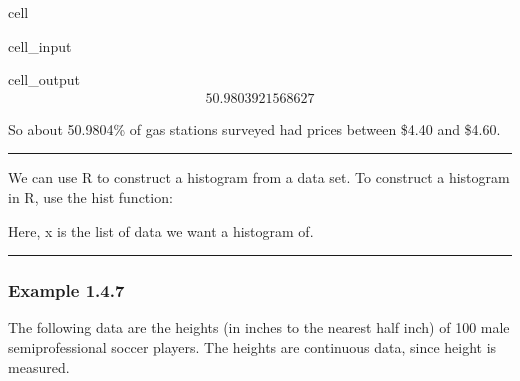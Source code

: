 \documentclass[letterpaper,10pt,english]{jupyterBook}
\begin{document}
\begin{sphinxuseclass}{cell}\begin{sphinxVerbatimInput}

\begin{sphinxuseclass}{cell_input}
\begin{sphinxVerbatim}[commandchars=\\\{\}]
\end{sphinxVerbatim}

\end{sphinxuseclass}\end{sphinxVerbatimInput}
\begin{sphinxVerbatimOutput}

\begin{sphinxuseclass}{cell_output}\begin{equation*}
\begin{split}50.9803921568627\end{split}
\end{equation*}
\end{sphinxuseclass}\end{sphinxVerbatimOutput}

\end{sphinxuseclass}
\sphinxAtStartPar
So about 50.9804\% of gas stations surveyed had prices between \$4.40 and \$4.60.


\bigskip\hrule\bigskip


\sphinxAtStartPar
We can use R to construct a histogram from a data set. To construct a histogram in R, use the hist function:

\begin{sphinxVerbatim}[commandchars=\\\{\}]
\end{sphinxVerbatim}

\sphinxAtStartPar
Here, x is the list of data we want a histogram of.


\bigskip\hrule\bigskip



\subsubsection{Example 1.4.7}
\label{\detokenize{Ch1 Sampling and Data/1.4 Tables and Charts:example-1-4-7}}
\sphinxAtStartPar
The following data are the heights (in inches to the nearest half inch) of 100 male semiprofessional soccer players. The heights are continuous data, since height is measured.
\end{document}
